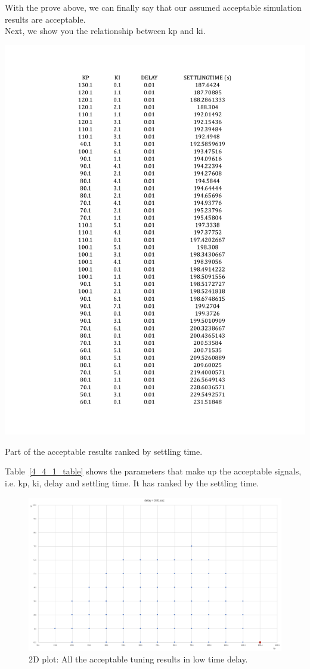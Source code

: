 With the prove above, we can finally say that our assumed acceptable simulation results are acceptable.\\

Next, we show you the relationship between kp and ki.\\

\begin{table}[htbp]
\centering
\includegraphics[width = \textwidth]{figure/4_4_1_table.pdf}
\caption{Part of the acceptable results ranked by settling time.}
\label{4_4_1_table}
\end{table}

 Table~\ref{4_4_1_table} shows the parameters that make up the acceptable signals, i.e. kp, ki, delay and settling time. It has ranked by the settling time. \\

\begin{figure}[htbp]
\centering
\includegraphics[width = .819\textwidth]{figure/4_4_1_2d.png}
\caption{2D plot: All the acceptable tuning results in low time delay.}
\label{4_4_1_2d}
\end{figure}

